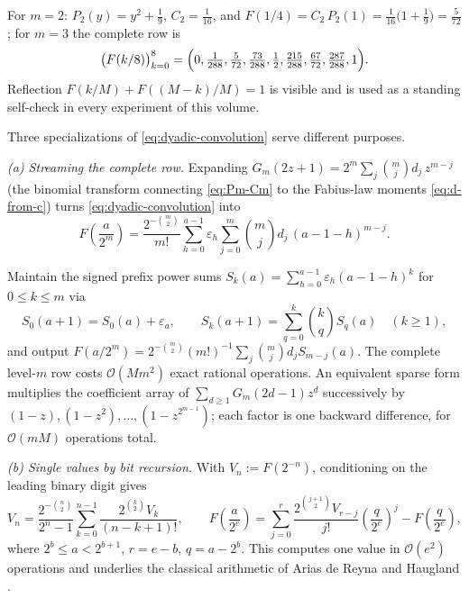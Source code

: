 \documentclass[11pt,oneside]{article}
\numberwithin{equation}{section}
\theoremstyle{definition}
\theoremstyle{remark}
\newcommand{\bigO}{\mathcal O}
\newcommand{\eps}{\varepsilon}
\begin{document}
\begin{example}
For $m=2$: $P_2(y)=y^2+\tfrac19$, $C_2=\tfrac1{16}$, and
$F(1/4)=C_2\,P_2(1)=\tfrac1{16}\bigl(1+\tfrac19\bigr)
=\tfrac5{72}$; for $m=3$ the complete row is
\[
 \bigl(F(k/8)\bigr)_{k=0}^{8}
 =\Bigl(0,\tfrac1{288},\tfrac5{72},\tfrac{73}{288},\tfrac12,
 \tfrac{215}{288},\tfrac{67}{72},\tfrac{287}{288},1\Bigr).
\]
Reflection $F(k/M)+F((M-k)/M)=1$ is visible and is used as a standing
self-check in every experiment of this volume.
\end{example}

Three specializations of \eqref{eq:dyadic-convolution} serve different
purposes.

\emph{(a) Streaming the complete row.}  Expanding
$G_m(2z+1)=2^m\sum_{j}\binom mj d_j\,z^{m-j}$ (the binomial transform
connecting \eqref{eq:Pm-Cm} to the Fabius-law moments
\eqref{eq:d-from-c}) turns \eqref{eq:dyadic-convolution} into
\begin{equation}
 F\!\left(\frac{a}{2^{m}}\right)
 =\frac{2^{-\binom m2}}{m!}
 \sum_{h=0}^{a-1}\eps_h
 \sum_{j=0}^{m}\binom mj d_j\,(a-1-h)^{m-j}.
 \label{eq:exact-dyadic-d}
\end{equation}

\begin{algorithm}
\label{alg:stream}
Maintain the signed prefix power sums
$S_k(a)=\sum_{h=0}^{a-1}\eps_h(a-1-h)^k$ for $0\le k\le m$ via
\[
 S_0(a+1)=S_0(a)+\eps_a,
 \qquad
 S_k(a+1)=\sum_{q=0}^{k}\binom kq S_q(a)\quad(k\ge1),
\]
and output
$F(a/2^m)=2^{-\binom m2}(m!)^{-1}\sum_j\binom mj d_j S_{m-j}(a)$.  The
complete level-$m$ row costs $\bigO(M m^2)$ exact rational operations.
An equivalent sparse form multiplies the coefficient array of
$\sum_{d\ge1}G_m(2d-1)z^d$ successively by
$(1-z),(1-z^2),\dots,(1-z^{2^{m-1}})$; each factor is one backward
difference, for $\bigO(mM)$ operations total.
\end{algorithm}

\emph{(b) Single values by bit recursion.}  With
$V_n:=F(2^{-n})$, conditioning on the leading binary digit gives
\begin{equation}
 V_n=\frac{2^{-\binom n2}}{2^{n}-1}
 \sum_{k=0}^{n-1}\frac{2^{\binom k2}V_k}{(n-k+1)!},
 \qquad
 F\!\left(\frac{a}{2^{e}}\right)
 =\sum_{j=0}^{r}\frac{2^{\binom{j+1}2}V_{r-j}}{j!}
 \left(\frac{q}{2^{e}}\right)^{j}
 -F\!\left(\frac{q}{2^{e}}\right),
 \label{eq:bit-recursion}
\end{equation}
where $2^{b}\le a<2^{b+1}$, $r=e-b$, $q=a-2^{b}$.  This computes one
value in $\bigO(e^2)$ operations and underlies the classical arithmetic
of Arias de Reyna and Haugland \cite{AriasArithmetic,Haugland2016}.
\end{document}
